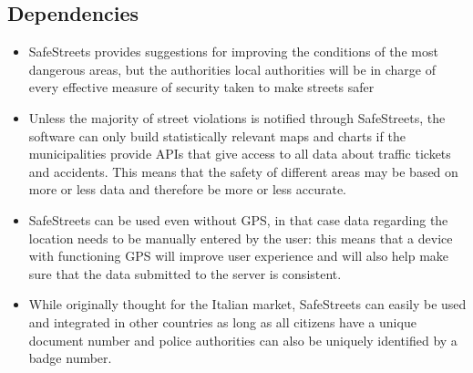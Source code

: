 \subsection{Dependencies}
  \begin{itemize}
    \item SafeStreets provides suggestions for improving the conditions of the most dangerous areas, but the authorities local authorities will be in charge of every effective measure of security taken to make streets safer
    \item Unless the majority of street violations is notified through SafeStreets, the software can only build statistically relevant maps and charts if the municipalities provide APIs that give access to all data about traffic tickets and accidents. This means that the safety of different areas may be based on more or less data and therefore be more or less accurate.
    \item SafeStreets can be used even without GPS, in that case data regarding the location needs to be manually entered by the user: this means that a device with functioning GPS will improve user experience and will also help make sure that the data submitted to the server is consistent.
    \item While originally thought for the Italian market, SafeStreets can easily be used and integrated in other countries as long as all citizens have a unique document number and police authorities can also be uniquely identified by a badge number. 
  \end{itemize}
